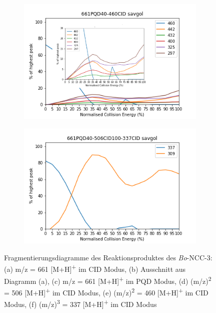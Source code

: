 \begin{figure}[!htbp]
  \begin{subfigure}[b]{0.5\textwidth}
    \includegraphics[width=\textwidth]{content/Anhang/ESIMS/RP_Bo-NCC-3/661PQD40-460CID-460savgol_pic.png}
    \caption{}
  \end{subfigure}
  \hfill
  \begin{subfigure}[b]{0.5\textwidth}
    \includegraphics[width=\textwidth]{content/Anhang/ESIMS/RP_Bo-NCC-3/661PQD40-506CID100-337CID-337savgol.png}
    \caption{}
  \end{subfigure}
  
  \caption[Fragmentierungsdiagramme des Reaktionsproduktes des \textit{Bo}-NCC-3, Quelle: Autor]{Fragmentierungsdiagramme des Reaktionsproduktes des \textit{Bo}-NCC-3: (a) m/z = 661 [M+H]\textsuperscript{+} im CID Modus, (b) Ausschnitt aus Diagramm (a), (c) m/z = 661 [M+H]\textsuperscript{+} im PQD Modus, (d) (m/z)\textsuperscript{2} = 506 [M+H]\textsuperscript{+} im CID Modus, (e) (m/z)\textsuperscript{2} = 460 [M+H]\textsuperscript{+} im CID Modus, (f) (m/z)\textsuperscript{3} = 337 [M+H]\textsuperscript{+} im CID Modus}
\end{figure}
